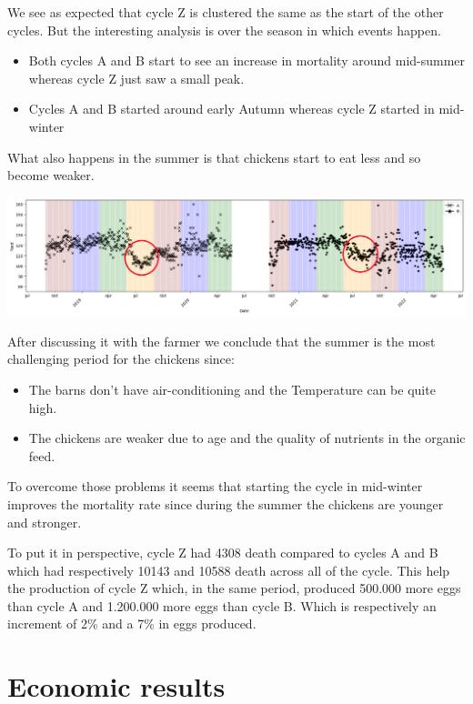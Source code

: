 \documentclass[11pt]{article}
\begin{document}
We see as expected that cycle Z is clustered the same as the start of the other cycles. But the interesting analysis is over the season in which events happen.

\begin{itemize}
    \item Both cycles A and B start to see an increase in mortality around mid-summer whereas cycle Z just saw a small peak.
    \item Cycles A and B started around early Autumn whereas cycle Z started in mid-winter
\end{itemize}

What also happens in the summer is that chickens start to eat less and so become weaker.

\includegraphics[width=\linewidth]{../Results/Comparison_Z_AB/feed_plot.png}

After discussing it with the farmer we conclude that the summer is the most challenging period for the chickens since:
\begin{itemize}
    \item The barns don't have air-conditioning and the Temperature can be quite high.
    \item The chickens are weaker due to age and the quality of nutrients in the organic feed.
\end{itemize}

To overcome those problems it seems that starting the cycle in mid-winter improves the mortality rate since during the summer the chickens are younger and stronger.

To put it in perspective, cycle Z had 4308 death compared to cycles A and B which had respectively 10143 and 10588 death across all of the cycle.
This help the production of cycle Z which, in the same period, produced 500.000 more eggs than cycle A and 1.200.000 more eggs than cycle B. Which is respectively an increment of 2\% and a 7\% in eggs produced.

\section{Economic results}
\end{document}
